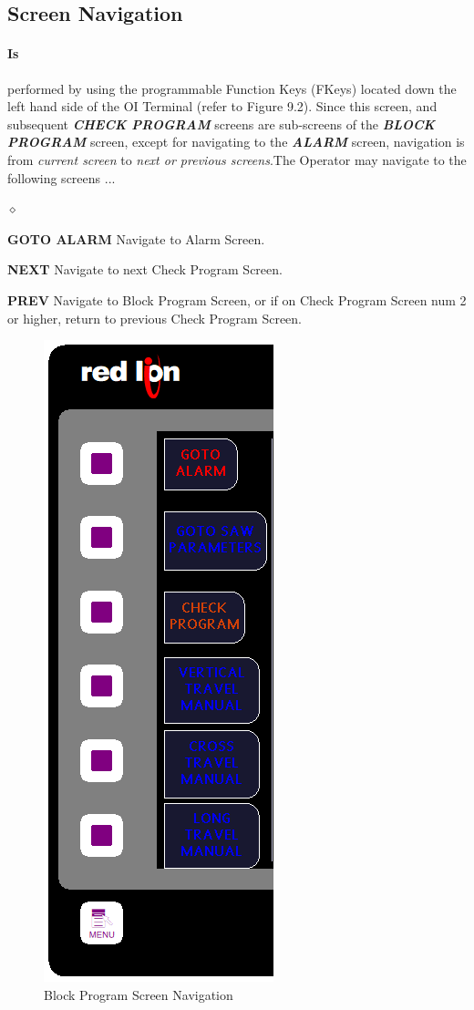 \subsection{Screen Navigation}
\paragraph*{Is}performed by using the programmable Function Keys (FKeys) located down the left hand side of the OI Terminal (refer to Figure 9.2). Since this screen, and subsequent 	\textbf{\textit{CHECK PROGRAM}} screens are sub-screens of the \textbf{\textit{BLOCK PROGRAM}} screen, except for navigating to the \textbf{\textit{ALARM}} screen, navigation is from \textit{current screen} to \textit{next or previous screens}.The Operator may navigate to the following screens ...
\begin{list}{$\diamond$}{}
	\item \textbf{GOTO ALARM} Navigate to Alarm Screen.
	\item \textbf{NEXT} Navigate to next Check Program Screen.
	\item \textbf{PREV} Navigate to Block Program Screen, or if on Check Program Screen num 2 or higher, return to previous Check Program Screen.
\end{list}
\begin{figure}
	\centering
	\includegraphics[width=0.2\linewidth]{screen-captures/program/cut-pgm-nav}
	\caption{Block Program Screen Navigation}
	\label{fig:cut-pgm-screen-nav}
\end{figure}
